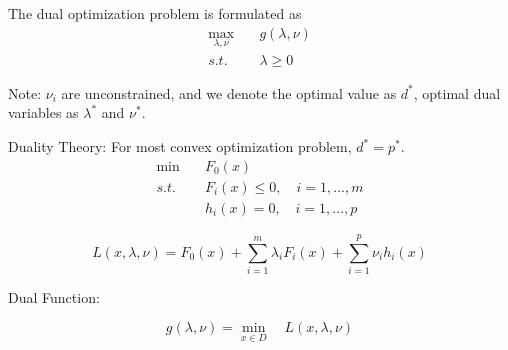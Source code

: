 \begin{definition} The dual optimization problem is formulated as
	\begin{align*}
	\max_{\lambda, \nu} \quad&g(\lambda, \nu) \\
	s.t. \quad&\lambda \geq 0
	\end{align*}

Note: $\nu_i$ are unconstrained, and we denote the optimal value as $d^*$, optimal dual variables as $\lambda^*$ and $\nu^*$.
\end{definition}


\vspace{0.3cm}
Duality Theory: For most convex optimization problem, $d^* = p^*$.\\


\begin{align*}
\min \quad&F_0(x) \\
s.t. \quad&F_i(x)\leq 0, \quad i = 1,...,m \\
&h_i(x)= 0, \quad i = 1,...,p
\end{align*}

\begin{equation*}
L(x,\lambda,\nu) = F_0(x) + \sum^m_{i=1}\lambda_i F_i(x) + \sum^p_{i=1}\nu_i h_i(x)
\end{equation*}

Dual Function:

\begin{equation*}
g(\lambda, \nu) = \min_{x\in D}\quad L(x,\lambda,\nu) 
\end{equation*}



